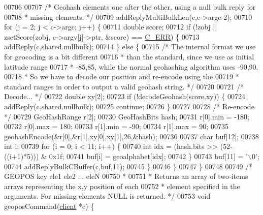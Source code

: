 \begin{DoxyCode}
{{{{{{{{{00706 
00707     \textcolor{comment}{/* Geohash elements one after the other, using a null bulk reply for}
00708 \textcolor{comment}{     * missing elements. */}
00709     addReplyMultiBulkLen(c,c->argc-2);
00710     \textcolor{keywordflow}{for} (j = 2; j < c->argc; j++) \{
00711         \textcolor{keywordtype}{double} score;
00712         \textcolor{keywordflow}{if} (!zobj || zsetScore(zobj, c->argv[j]->ptr, &score) == \hyperlink{server_8h_af98ac28d5f4d23d7ed5985188e6fb7d1}{C\_ERR}) \{
00713             addReply(c,shared.nullbulk);
00714         \} \textcolor{keywordflow}{else} \{
00715             \textcolor{comment}{/* The internal format we use for geocoding is a bit different}
00716 \textcolor{comment}{             * than the standard, since we use as initial latitude range}
00717 \textcolor{comment}{             * -85,85, while the normal geohashing algorithm uses -90,90.}
00718 \textcolor{comment}{             * So we have to decode our position and re-encode using the}
00719 \textcolor{comment}{             * standard ranges in order to output a valid geohash string. */}
00720 
00721             \textcolor{comment}{/* Decode... */}
00722             \textcolor{keywordtype}{double} xy[2];
00723             \textcolor{keywordflow}{if} (!decodeGeohash(score,xy)) \{
00724                 addReply(c,shared.nullbulk);
00725                 \textcolor{keywordflow}{continue};
00726             \}
00727 
00728             \textcolor{comment}{/* Re-encode */}
00729             GeoHashRange r[2];
00730             GeoHashBits hash;
00731             r[0].min = -180;
00732             r[0].max = 180;
00733             r[1].min = -90;
00734             r[1].max = 90;
00735             geohashEncode(&r[0],&r[1],xy[0],xy[1],26,&hash);
00736 
00737             \textcolor{keywordtype}{char} buf[12];
00738             \textcolor{keywordtype}{int} i;
00739             \textcolor{keywordflow}{for} (i = 0; i < 11; i++) \{
00740                 \textcolor{keywordtype}{int} idx = (hash.bits >> (52-((i+1)*5))) & 0x1f;
00741                 buf[i] = geoalphabet[idx];
00742             \}
00743             buf[11] = \textcolor{stringliteral}{'\(\backslash\)0'};
00744             addReplyBulkCBuffer(c,buf,11);
00745         \}
00746     \}
00747 \}
00748 
00749 \textcolor{comment}{/* GEOPOS key ele1 ele2 ... eleN}
00750 \textcolor{comment}{ *}
00751 \textcolor{comment}{ * Returns an array of two-items arrays representing the x,y position of each}
00752 \textcolor{comment}{ * element specified in the arguments. For missing elements NULL is returned. */}
00753 \textcolor{keywordtype}{void} geoposCommand(\hyperlink{structclient}{client} *c) \{
}}}}}}}}}
\end{DoxyCode}
